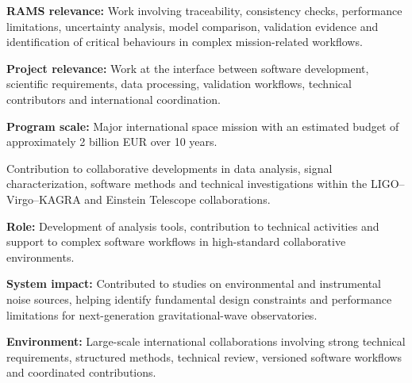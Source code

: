\documentclass[8pt,a4paper,ragged2e,withhyper]{altacv}
\begin{document}
\textbf{RAMS relevance:} Work involving traceability, consistency checks, performance limitations, uncertainty analysis, model comparison, validation evidence and identification of critical behaviours in complex mission-related workflows.

\textbf{Project relevance:} Work at the interface between software development, scientific requirements, data processing, validation workflows, technical contributors and international coordination.

\textbf{Program scale:} Major international space mission with an estimated budget of approximately 2 billion EUR over 10 years.

\divider


Contribution to collaborative developments in data analysis, signal characterization, software methods and technical investigations within the LIGO--Virgo--KAGRA and Einstein Telescope collaborations.

\textbf{Role:} Development of analysis tools, contribution to technical activities and support to complex software workflows in high-standard collaborative environments.

\textbf{System impact:} Contributed to studies on environmental and instrumental noise sources, helping identify fundamental design constraints and performance limitations for next-generation gravitational-wave observatories.

\textbf{Environment:} Large-scale international collaborations involving strong technical requirements, structured methods, technical review, versioned software workflows and coordinated contributions.


\vspace{-.3cm}


{\small
{}
}

\divider\smallskip
\vspace{-.3cm}
\end{document}
